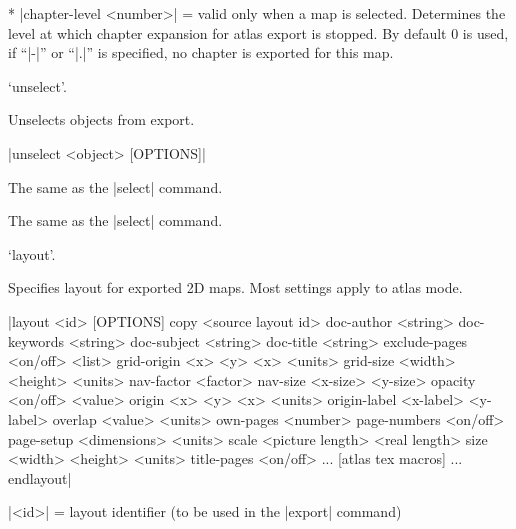   * |chapter-level <number>| = valid only when a map is selected. Determines
    the level at which chapter expansion for atlas export is stopped. 
    By default 0 is used, if ``|-|'' or ``|.|'' is specified, no chapter is
    exported for this map.
\endoptions



\subsubchapter `unselect'.

\description
  Unselects objects from export.
\enddescription

\syntax
  |unselect <object> [OPTIONS]|
\endsyntax

\arguments
  The same as the |select| command.
\endarguments

\options
  The same as the |select| command. 
\endoptions


\subsubchapter `layout'.

\description
  Specifies layout for exported 2D maps. Most settings apply 
  to atlas mode.
\enddescription

\syntax
  |layout <id> [OPTIONS]
          copy <source layout id>
          doc-author <string>
          doc-keywords <string>
          doc-subject <string>
          doc-title <string>
          exclude-pages <on/off> <list>
          grid-origin <x> <y> <x> <units>
          grid-size <width> <height> <units>
          nav-factor <factor>
          nav-size <x-size> <y-size>
          opacity <on/off> <value>
          origin <x> <y> <x> <units>
          origin-label <x-label> <y-label>
          overlap <value> <units>
          own-pages <number>
          page-numbers <on/off>
          page-setup <dimensions> <units>
          scale <picture length> <real length>
          size <width> <height> <units>
          title-pages <on/off>
          ... [atlas tex macros] ...
        endlayout|
\endsyntax

\arguments
  |<id>| = layout identifier (to be used in the |export| command)
\endarguments

\options
\endoptions

